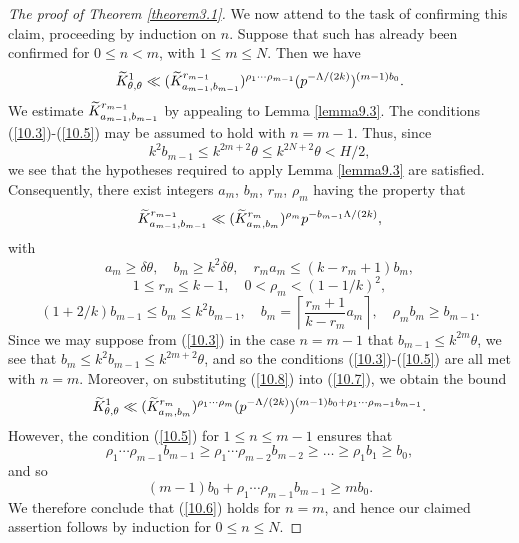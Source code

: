 \documentclass[12pt,reqno]{amsart}
\theoremstyle{definition}
\theoremstyle{remark}
\numberwithin{equation}{section}
\def\del{{\delta}} \def\Del{{\Delta}} \def\Deltil{{\widetilde \Delta}}
\def\tet{{\theta}} \def\bftet{{\boldsymbol \theta}}
\def\le{\leqslant} \def\ge{\geqslant} \def\pleq{\preccurlyeq} \def\ple{\prec}
\begin{document}
\begin{proof}[The proof of Theorem \ref{theorem3.1}]
We now attend to the task of confirming this claim, proceeding by induction on $n$. 
Suppose that such has already been confirmed for $0\le n<m$, with $1\le m\le N$. Then we 
have
\begin{equation}\label{10.7}
\Ktil_{\tet,\tet}^1\ll (\Ktil_{a_{m-1},b_{m-1}}^{r_{m-1}})^{\rho_1\cdots \rho_{m-1}}
(p^{-\Lam/(2k)})^{(m-1)b_0}.
\end{equation}
We estimate $\widetilde K_{a_{m-1},b_{m-1}}^{r_{m-1}}$ by appealing to Lemma 
\ref{lemma9.3}. The conditions (\ref{10.3})-(\ref{10.5}) may be assumed to hold with 
$n=m-1$. Thus, since
$$k^2b_{m-1}\le k^{2m+2}\tet\le k^{2N+2}\tet<H/2,$$
we see that the hypotheses required to apply Lemma \ref{lemma9.3} are satisfied. 
Consequently, there exist integers $a_m$, $b_m$, $r_m$, $\rho_m$ having the property 
that
\begin{equation}\label{10.8}
\widetilde K_{a_{m-1},b_{m-1}}^{r_{m-1}}\ll (\widetilde K_{a_m,b_m}^{r_m})^{\rho_m}
p^{-b_{m-1}{\Lambda}/(2k)},
\end{equation}
with
$$a_m\ge \del \tet,\quad b_m\ge k^2\del \tet,\quad r_ma_m\le (k-r_m+1)b_m,$$
$$1\le r_m\le k-1,\quad 0<\rho_m<(1-1/k)^2,$$
$$(1+2/k)b_{m-1}\le b_m\le k^2b_{m-1},\quad 
b_m=\left\lceil \frac{r_m+1}{k-r_m}a_m\right\rceil ,\quad \rho_mb_m\ge b_{m-1}.$$
Since we may suppose from (\ref{10.3}) in the case $n=m-1$ that 
$b_{m-1}\le k^{2m}\tet$, we see that $b_m\le k^2b_{m-1}\le k^{2m+2}\tet$, and so 
the conditions (\ref{10.3})-(\ref{10.5}) are all met with $n=m$. Moreover, on substituting 
(\ref{10.8}) into (\ref{10.7}), we obtain the bound
$$\Ktil_{\tet,\tet}^1\ll (\Ktil_{a_m,b_m}^{r_m})^{\rho_1\cdots \rho_m}
(p^{-\Lam/(2k)})^{(m-1)b_0+\rho_1\cdots \rho_{m-1}b_{m-1}}.$$
However, the condition (\ref{10.5}) for $1\le n\le m-1$ ensures that
$$\rho_1\cdots \rho_{m-1}b_{m-1}\ge \rho_1\cdots \rho_{m-2}b_{m-2}\ge \ldots 
\ge \rho_1b_1\ge b_0,$$
and so
$$(m-1)b_0+\rho_1\cdots \rho_{m-1}b_{m-1}\ge mb_0.$$
We therefore conclude that (\ref{10.6}) holds for $n=m$, and hence our claimed 
assertion follows by induction for $0\le n\le N$.\par


\end{proof}
\end{document}
